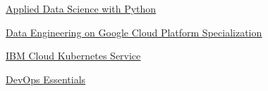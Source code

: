\begin{coursework}



        {\href{https://www.youracclaim.com/badges/6f524dff-5ffb-42bd-8e32-f4f3ea50e26c/public_url}
        {\underline{Applied Data Science with Python}}}

        {\href{https://www.coursera.org/account/accomplishments/specialization/certificate/3MKRH4BJ5MKQ}
        {\underline{Data Engineering on Google Cloud Platform Specialization}}}

        {\href{https://www.youracclaim.com/badges/70a31b3d-c964-4a2d-8f31-ed58a0b00ea7}
        {\underline{IBM Cloud Kubernetes Service}}}

        {\href{https://www.youracclaim.com/badges/b2d8b99b-d28c-4e36-9969-926df409912d}
        {\underline{DevOps Essentials}}}


\end{coursework}